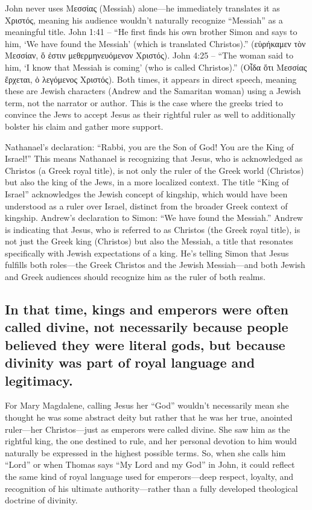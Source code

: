 John never uses Μεσσίας (Messiah) alone---he immediately translates it as Χριστός, meaning his audience wouldn't naturally recognize ``Messiah'' as a meaningful title.
John 1:41 -- ``He first finds his own brother Simon and says to him, `We have found the Messiah' (which is translated Christos).'' (εὑρήκαμεν τὸν Μεσσίαν, ὅ ἐστιν μεθερμηνευόμενον Χριστός).
John 4:25 -- ``The woman said to him, `I know that Messiah is coming' (who is called Christos).'' (Οἶδα ὅτι Μεσσίας ἔρχεται, ὁ λεγόμενος Χριστός).
Both times, it appears in direct speech, meaning these are Jewish characters (Andrew and the Samaritan woman) using a Jewish term, not the narrator or author.
This is the case where the greeks tried to convince the Jews to accept Jesus as their rightful ruler as well to additionally bolster his claim and gather more support.

Nathanael's declaration: ``Rabbi, you are the Son of God!
You are the King of Israel!'' This means Nathanael is recognizing that Jesus, who is acknowledged as Christos (a Greek royal title), is not only the ruler of the Greek world (Christos) but also the king of the Jews, in a more localized context.
The title ``King of Israel'' acknowledges the Jewish concept of kingship, which would have been understood as a ruler over Israel, distinct from the broader Greek context of kingship.
Andrew's declaration to Simon: ``We have found the Messiah.'' Andrew is indicating that Jesus, who is referred to as Christos (the Greek royal title), is not just the Greek king (Christos) but also the Messiah, a title that resonates specifically with Jewish expectations of a king.
He's telling Simon that Jesus fulfills both roles---the Greek Christos and the Jewish Messiah---and both Jewish and Greek audiences should recognize him as the ruler of both realms.

\subsection{In that time, kings and emperors were often called divine, not necessarily because people believed they were literal gods, but because divinity was part of royal language and legitimacy.}\label{subsec:in-that-time-kings-and-emperors-were-often-called-divine-not-necessarily-because-people-believed-they-were-literal-gods-but-because-divinity-was-part-of-royal-language-and-legitimacy.}

For Mary Magdalene, calling Jesus her ``God'' wouldn't necessarily mean she thought he was some abstract deity but rather that he was her true, anointed ruler---her Christos---just as emperors were called divine.
She saw him as the rightful king, the one destined to rule, and her personal devotion to him would naturally be expressed in the highest possible terms.
So, when she calls him ``Lord'' or when Thomas says ``My Lord and my God'' in John, it could reflect the same kind of royal language used for emperors---deep respect, loyalty, and recognition of his ultimate authority---rather than a fully developed theological doctrine of divinity.

